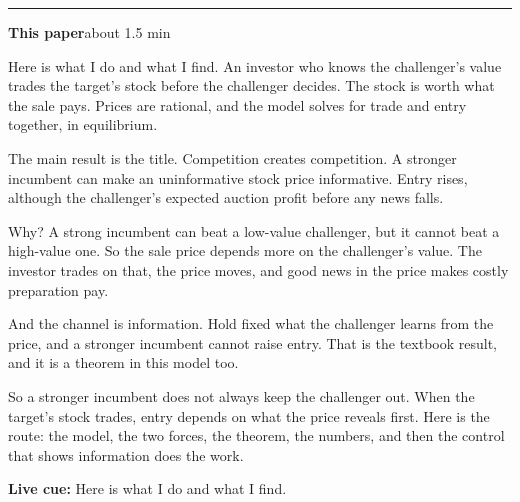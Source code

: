 \documentclass[11pt]{article}
\newcommand{\Cue}[1]{\par\nobreak\smallskip\noindent
  \textcolor{ScriptGray}{\footnotesize\textbf{Live cue:} #1}\par}
\newcommand{\scriptframe}[3]{%
  \Needspace{9\baselineskip}%
  \par\medskip\noindent\textcolor{ScriptBlue}{\rule{\linewidth}{0.55pt}}%
  \par\smallskip\noindent
  \textbf{#1}\hfill\textcolor{ScriptGray}{\small #2}\par\smallskip
  #3\par}
\begin{document}
\scriptframe{This paper}{about 1.5 min}{%
  Here is what I do and what I find. An investor who knows the challenger's
  value trades the target's stock before the challenger decides. The stock is
  worth what the sale pays. Prices are rational, and the model solves for trade
  and entry together, in equilibrium.

  The main result is the title. Competition creates competition. A stronger
  incumbent can make an uninformative stock price informative. Entry rises,
  although the challenger's expected auction profit before any news falls.

  Why? A strong incumbent can beat a low-value challenger, but it cannot beat a
  high-value one. So the sale price depends more on the challenger's value. The
  investor trades on that, the price moves, and good news in the price makes
  costly preparation pay.

  And the channel is information. Hold fixed what the challenger learns from
  the price, and a stronger incumbent cannot raise entry. That is the textbook result, and it is
  a theorem in this model too.

  So a stronger incumbent does not always keep the challenger out. When the
  target's stock trades, entry depends on what the price reveals first. Here is
  the route: the model, the two forces, the theorem, the numbers, and then the
  control that shows information does the work.
  \Cue{Here is what I do and what I find.}
}
\end{document}
